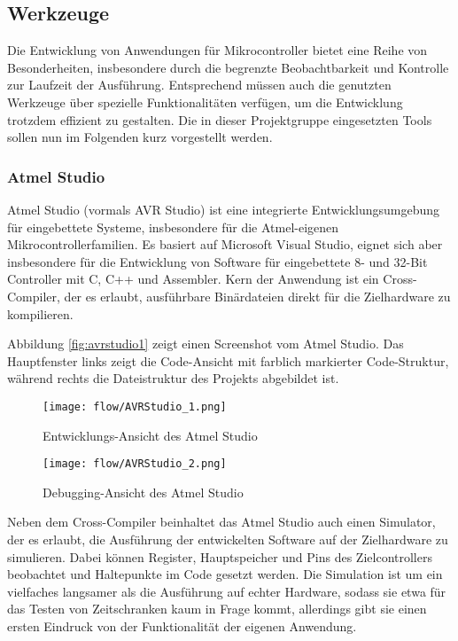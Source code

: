 \subsection{Werkzeuge}
Die Entwicklung von Anwendungen für Mikrocontroller bietet eine Reihe von Besonderheiten, insbesondere durch die begrenzte Beobachtbarkeit und Kontrolle zur Laufzeit der Ausführung. Entsprechend müssen auch die genutzten Werkzeuge über spezielle Funktionalitäten verfügen, um die Entwicklung trotzdem effizient zu gestalten. Die in dieser Projektgruppe eingesetzten Tools sollen nun im Folgenden kurz vorgestellt werden.

\subsubsection{Atmel Studio}
Atmel Studio (vormals AVR Studio) ist eine integrierte Entwicklungsumgebung für eingebettete Systeme, insbesondere für die Atmel-eigenen Mikrocontrollerfamilien.
Es basiert auf Microsoft Visual Studio, eignet sich aber insbesondere für die Entwicklung von Software für eingebettete 8- und 32-Bit Controller mit C, C++ und Assembler.
Kern der Anwendung ist ein Cross-Compiler, der es erlaubt, ausführbare Binärdateien direkt für die Zielhardware zu kompilieren.

Abbildung \autoref{fig:avrstudio1} zeigt einen Screenshot vom Atmel Studio. Das Hauptfenster links zeigt die Code-Ansicht mit farblich markierter Code-Struktur, während rechts die Dateistruktur des Projekts abgebildet ist.

\begin{figure}[!t]
  \centering
    \texttt{[image: flow/AVRStudio\_1.png]}
    \caption{Entwicklungs-Ansicht des Atmel Studio}
    \label{fig:avrstudio1}
\end{figure}

\begin{figure}[!h]
  \centering
    \texttt{[image: flow/AVRStudio\_2.png]}
    \caption{Debugging-Ansicht des Atmel Studio}
    \label{fig:avrstudio2}
\end{figure}

Neben dem Cross-Compiler beinhaltet das Atmel Studio auch einen Simulator, der es erlaubt, die Ausführung der entwickelten Software auf der Zielhardware zu simulieren. Dabei können Register, Hauptspeicher und Pins des Zielcontrollers beobachtet und Haltepunkte im Code gesetzt werden. Die Simulation ist um ein vielfaches langsamer als die Ausführung auf echter Hardware, sodass sie etwa für das Testen von Zeitschranken kaum in Frage kommt, allerdings gibt sie einen ersten Eindruck von der Funktionalität der eigenen Anwendung.

